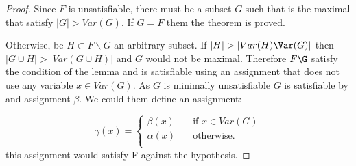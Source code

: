 \begin{proof}
  Since $F$ is unsatisfiable, there must be a subset $G$ such that is the maximal that satisfy $|G| > Var(G)$. If $G=F$ them the theorem is proved.


  Otherwise, be $H \subset F\backslash G$ an arbitrary subset. If $|H| > |Var(H)\Var(G)|$ then $|G \cup H| > |Var(G\cup H)|$ and $G$ would not be maximal.  Therefore $F\G$ satisfy the condition of the lemma and is satisfiable using an assignment that does not use any variable $x \in Var(G)$. As $G$ is minimally unsatisfiable $G$ is satisfiable by and assignment $\beta$. We could them define an assignment:

  \[   
\gamma(x) = 
     \begin{cases}
       \beta(x) &\quad\text{if } x \in Var(G)\\
       \alpha(x) &\quad\text{otherwise.} \\ 
     \end{cases}
   \]
this assignment would satisfy F against the hypothesis.
\end{proof}




